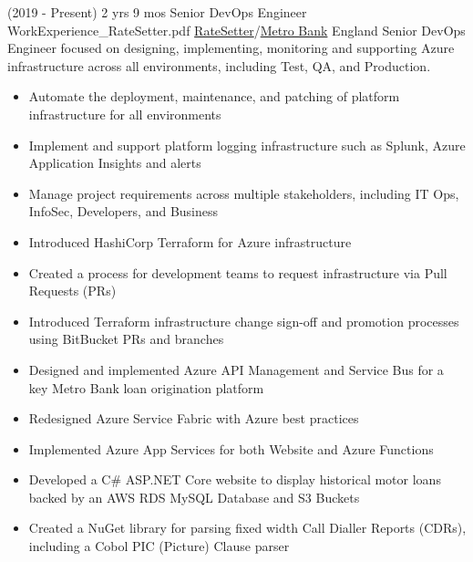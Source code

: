 
\begin{twenty}
\twentyitem
  {(2019 - Present) 2 yrs 9 mos}
  {Senior DevOps Engineer}
  {WorkExperience_RateSetter.pdf}
  {\href{https://www.ratesetter.com/}{RateSetter}/\href{https://metrobankonline.co.uk}{Metro Bank}}
  {England}
  {Senior DevOps Engineer focused on designing, implementing, monitoring and supporting Azure infrastructure across all environments, including Test, QA, and Production.}
  {\begin{itemize}
    \item Automate the deployment, maintenance, and patching of platform infrastructure for all environments
    \item Implement and support platform logging infrastructure such as Splunk, Azure Application Insights and alerts
    \item Manage project requirements across multiple stakeholders, including IT Ops, InfoSec, Developers, and Business
  \end{itemize}}
  {\begin{itemize}
    \item Introduced HashiCorp Terraform for Azure infrastructure
    \item Created a process for development teams to request infrastructure via Pull Requests (PRs)
    \item Introduced Terraform infrastructure change sign-off and promotion processes using BitBucket PRs and branches
    \item Designed and implemented Azure API Management and Service Bus for a key Metro Bank loan origination platform
    \item Redesigned Azure Service Fabric with Azure best practices
    \item Implemented Azure App Services for both Website and Azure Functions
    \item Developed a C\# ASP.NET Core website to display historical motor loans backed by an AWS RDS MySQL Database and S3 Buckets
    \item Created a NuGet library for parsing fixed width Call Dialler Reports (CDRs), including a Cobol PIC (Picture) Clause parser
  \end{itemize}}
\end{twenty}

